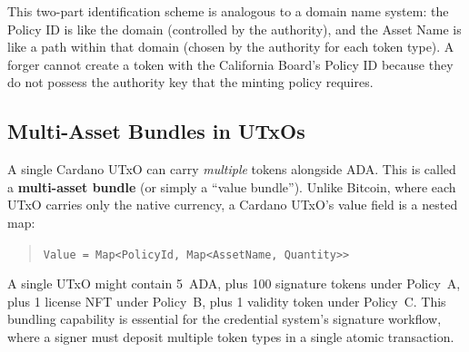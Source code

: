 This two-part identification scheme is analogous to a domain name
system: the Policy ID is like the domain (controlled by the authority),
and the Asset Name is like a path within that domain (chosen by the
authority for each token type). A forger cannot create a token with the
California Board's Policy ID because they do not possess the authority
key that the minting policy requires.

\subsection{Multi-Asset Bundles in UTxOs}

A single Cardano UTxO can carry \emph{multiple} tokens alongside ADA.
This is called a \textbf{multi-asset bundle} (or simply a ``value
bundle''). Unlike Bitcoin, where each UTxO carries only the native
currency, a Cardano UTxO's value field is a nested map:

\begin{quote}
\texttt{Value = Map<PolicyId, Map<AssetName, Quantity>>}
\end{quote}

A single UTxO might contain 5~ADA, plus 100 signature tokens under
Policy~A, plus 1 license NFT under Policy~B, plus 1 validity token
under Policy~C. This bundling capability is essential for the credential
system's signature workflow, where a signer must deposit multiple token
types in a single atomic transaction.

